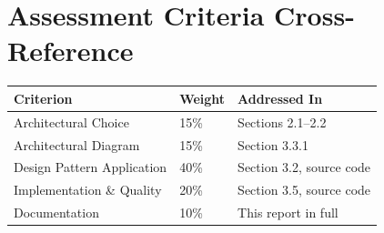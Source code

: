 \documentclass[12pt,a4paper]{article}
\begin{document}
\section{Assessment Criteria Cross-Reference}
\begin{table}[h]
\centering
\begin{tabular}{|p{5cm}|p{2cm}|p{5cm}|}
\hline
\textbf{Criterion} & \textbf{Weight} & \textbf{Addressed In} \\
\hline
Architectural Choice & 15\% & Sections 2.1–2.2 \\
Architectural Diagram & 15\% & Section 3.3.1 \\
Design Pattern Application & 40\% & Section 3.2, source code \\
Implementation \& Quality & 20\% & Section 3.5, source code \\
Documentation & 10\% & This report in full \\
\hline
\end{tabular}
\end{table}
\end{document}
